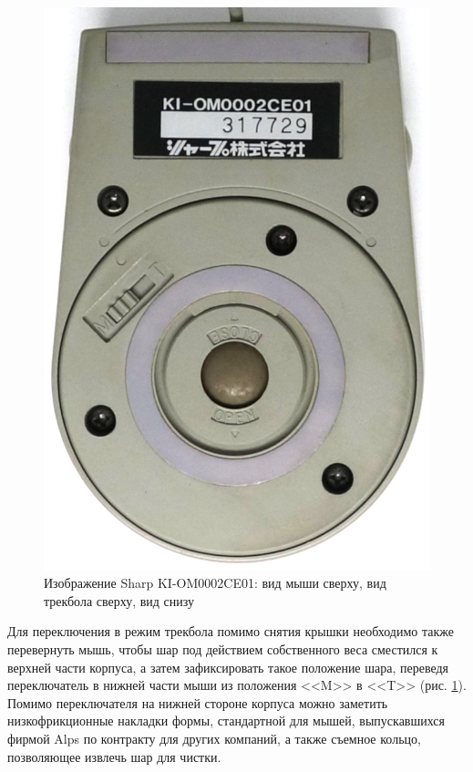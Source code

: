 \documentclass[11pt, a4paper]{article}
\begin{document}
\begin{figure}[h]
    \includegraphics[scale=0.6]{1987_sharp_convertible/bottom_30.jpg}
    \caption{Изображение Sharp KI-OM0002CE01: вид мыши сверху, вид трекбола сверху, вид снизу}
    \label{fig:SharpConvertibleTopAndBottom}
\end{figure}

Для переключения в режим трекбола помимо снятия крышки необходимо также перевернуть мышь, чтобы шар под действием собственного веса сместился к верхней части корпуса, а затем зафиксировать такое положение шара, переведя переключатель в нижней части мыши из положения <<M>> в <<T>> (рис. \ref{fig:SharpConvertibleTopAndBottom}). Помимо переключателя на нижней стороне корпуса можно заметить низкофрикционные накладки формы, стандартной для мышей, выпускавшихся фирмой Alps по контракту  для других компаний, а также съемное кольцо, позволяющее извлечь шар для чистки.
\end{document}
